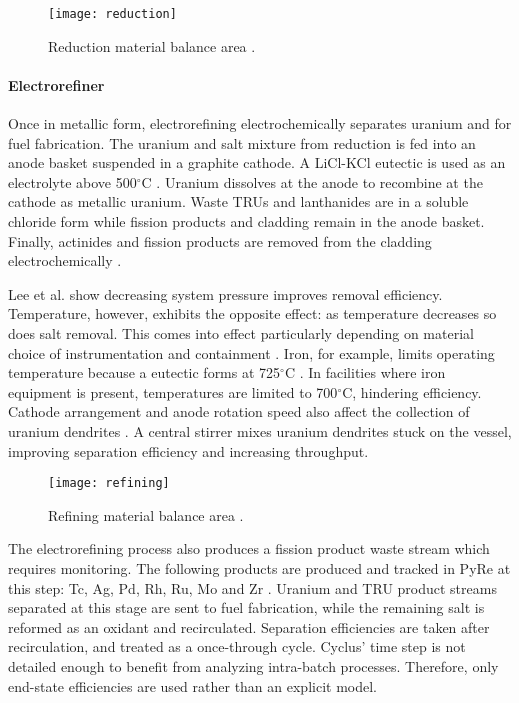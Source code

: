 \begin{figure} 
	\centering
	\texttt{[image: reduction]}
	\caption{Reduction material balance area \cite{lee_advanced_2008}.}
	\label{fig:reduction}
\end{figure}

\paragraph{Electrorefiner}

Once in metallic form, electrorefining electrochemically separates uranium and  for fuel fabrication.
The uranium and salt mixture from reduction is fed into an anode basket suspended in a graphite cathode. 
A LiCl-KCl eutectic is used as an electrolyte above 500$^{\circ}$C \cite{flowsheet_1998,lee_korean_2011}. 
Uranium dissolves at the anode to recombine at the cathode as metallic uranium.
Waste \glspl{TRU} and lanthanides are in a soluble chloride form  while fission products and cladding remain in the anode
basket. Finally, actinides and fission products are removed from the cladding electrochemically \cite{lee_korean_2011}.

Lee et al. \cite{lee_advanced_2008} show decreasing system pressure improves removal efficiency. 
Temperature, however, exhibits the opposite effect: as temperature decreases so does salt removal. This comes into effect 
particularly depending on material choice of instrumentation and containment \cite{lee_advanced_2008}. 
Iron, for example, limits operating temperature because a eutectic forms at 725$^{\circ}$C \cite{chapman_revision_1984}.
In facilities where iron equipment is present, temperatures are limited to 700$^{\circ}$C, hindering efficiency. 
Cathode arrangement and anode rotation speed also affect the collection of uranium 
dendrites \cite{lee_advanced_2008}. A central stirrer mixes uranium dendrites stuck on 
the vessel, improving separation efficiency and increasing throughput. 

\begin{figure}
	\centering
	\texttt{[image: refining]}
	\caption{Refining material balance area \cite{lee_advanced_2008}.}
	\label{fig:refining}
\end{figure}

The electrorefining process also produces a fission product waste stream which requires monitoring. 
The following products are produced and tracked in \gls{PyRe} at this step: Tc, Ag, Pd, Rh, Ru, Mo and Zr \cite{flowsheet_1998}. 
Uranium and \gls{TRU} product streams separated at this stage are sent to fuel fabrication, while the remaining salt is reformed as an oxidant and recirculated.
Separation efficiencies are taken after recirculation, and treated as a once-through cycle. Cyclus' time step
is not detailed enough to benefit from analyzing intra-batch processes. Therefore, only end-state efficiencies are used rather than an explicit model.

